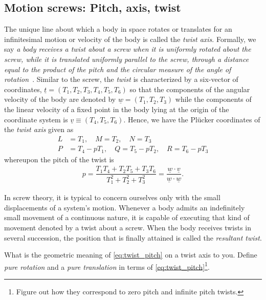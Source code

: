 \subsection{Motion screws: Pitch, axis, twist}
%
The unique line about which a body in space rotates or translates for an infinitesimal motion or velocity of the body is called the \textit{twist axis}. Formally, we say \textit{a body receives a twist about a screw when it is uniformly rotated about the screw, while it is translated uniformly parallel to the screw, through a distance equal to the product of the pitch and the circular measure of the angle of rotation}~\cite{Ball}. Similar to the screw, the \textit{twist} is characterized by a six-vector of coordinates, $\underline{t}=(T_1, T_2, T_3, T_4, T_5, T_6)$ so that the components of the angular velocity of the body are denoted by $\underline{w}=(T_1, T_2, T_3)$ while the components of the linear velocity of a fixed point in the body lying at the origin of the coordinate system is $\underline{v}\equiv(T_4, T_5, T_6)$. Hence, we have the Pl\"ucker coordinates of the \textit{twist axis} given as
%
\begin{subequations}
	\begin{align}
	L &= T_1,\quad M=T_2, \quad N=T_3 \\
	P &= T_4 - pT_1, \quad Q=T_5-pT_2, \quad R = T_6 - pT_3
	\end{align}
\end{subequations}
%
whereupon the pitch of the twist is 
%
\begin{align}
	p = \dfrac{T_1T_4+T_2T_5+T_3T_6}{T_1^2+T_2^2+T_3^2} = \dfrac{\underline{w}\cdot \underline
	{v}}{\underline{w}\cdot \underline{w} }.
	\label{eq:twist_pitch}
\end{align}


In screw theory, it is typical to concern ourselves only with the small displacements of a system's motion. Whenever a body admits an indefinitely small movement of a continuous nature, it is capable of executing that kind of movement denoted by a twist about a screw. When the body receives twists in several succession, the position that is finally attained is called the \textit{resultant twist}.

\noindent 
\begin{homework}
	What is the geometric meaning of \eqref{eq:twist_pitch} on a twist axis to you. Define \textit{pure rotation} and a \textit{pure translation} in terms of \eqref{eq:twist_pitch}\footnote{Figure out how they correspond to zero pitch and infinite pitch twists.}. 
\end{homework} 

